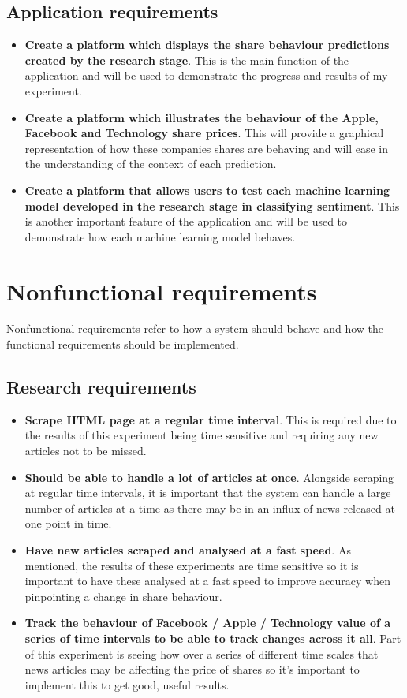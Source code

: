 \documentclass[a4paper,11pt]{report}
\begin{document}
\subsection {Application requirements}
\begin{itemize}
  \item \textbf{Create a platform which displays the share behaviour predictions created by the research stage}. This is the main function of the application and will be used to demonstrate the progress and results of my experiment.
    \item \textbf{Create a platform which illustrates the behaviour of the Apple, Facebook and Technology share prices}. This will provide a graphical representation of how these companies shares are behaving and will ease in the understanding of the context of each prediction.
    \item \textbf{Create a platform that allows users to test each machine learning model developed in the research stage in classifying sentiment}. This is another important feature of the application and will be used to demonstrate how each machine learning model behaves.
\end{itemize}

\section{Nonfunctional requirements}
Nonfunctional requirements refer to how a system should behave and how the functional requirements should be implemented.

\subsection{Research requirements}
\begin{itemize}
    \item \textbf{Scrape HTML page at a regular time interval}. This is required due to the results of this experiment being time sensitive and requiring any new articles not to be missed.
  \item \textbf{Should be able to handle a lot of articles at once}. Alongside scraping at regular time intervals, it is important that the system can handle a large number of articles at a time as there may be in an influx of news released at one point in time.
    \item \textbf{Have new articles scraped and analysed at a fast speed}. As mentioned, the results of these experiments are time sensitive so it is important to have these analysed at a fast speed to improve accuracy when pinpointing a change in share behaviour.
    \item \textbf{Track the behaviour of Facebook / Apple / Technology value of a series of time intervals to be able to track changes across it all}. Part of this experiment is seeing how over a series of different time scales that news articles may be affecting the price of shares so it's important to implement this to get good, useful results.
\end{itemize}
\end{document}
